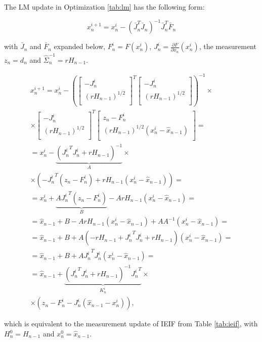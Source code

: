  The LM update in Optimization \ref{tab:lm} has the following form: 
 
 \begin{equation}
 x_n^{i + 1}= x_n^{i} - (\bar{J}_n^T \bar{J}_n)^{-1} \bar{J}_n^T \bar{F}_n 
\end{equation}
 
 with $\bar{J}_n$ and $\bar{F}_n$ expanded below, $F_n^i = F(x_n^i)$, 
 $J_n^i = \frac{\partial F}{\partial x_n}(x_n^i)$, the measurement $z_n = d_n$ and $\hat{\Sigma}_n^{-1} = r H_{n - 1}$.
 
 \begin{align*}
x_n^{i + 1}= x_n^{i} - \left(
\left[
	\begin{array}{cc}
		- J_n^i \\
		\left(r H_{n - 1}\right)^{1/2} \\
	\end{array}
\right]^T 
\left[
	\begin{array}{c}
		- J_n^i \\
		\left(r H_{n - 1}\right)^{1/2} \\
	\end{array}
\right]
\right)^{-1} \times\\
\times \left[
	\begin{array}{cc}
		- J_n^i \\
		\left(r H_{n - 1}\right)^{1/2} \\
	\end{array}
\right]^T 
\left[
	\begin{array}{c}
		z_n - F_n^i \\
		\left(r H_{n - 1}\right)^{1/2}(x_n^i - \hat{x}_{n - 1}) \\
	\end{array}
\right] = \\
= x_n^{i} - \underbrace{\left({J_n^i}^T J_n^i + r H_{n - 1}\right)^{-1}}_{A} \times \\
\times \left( - {J_n^i}^T(z_n - F_n^i) + r H_{n - 1}(x_n^i - \hat{x}_{n - 1})\right)  = \\
= x_n^i +\underbrace{A {J_n^i}^T(z_n - F_n^i)}_B - A r H_{n - 1}(x_n^i - \hat{x}_{n - 1})  = \\
= \hat{x}_{n - 1} + B  - A r H_{n - 1}(x_n^i - \hat{x}_{n - 1}) + A A^{-1}( x_n^i - \hat{x}_{n - 1}) = \\
= \hat{x}_{n - 1} + B + A(- r H_{n - 1} + {J_n^i}^T J_n^i + r H_{n - 1})(x_n^i - \hat{x}_{n - 1}) = \\
= \hat{x}_{n - 1} + B + A {J_n^i}^T J_n^i (x_n^i - \hat{x}_{n - 1}) = \\
= \hat{x}_{n - 1} + \underbrace{\left({J_n^i}^T J_n^i + r H_{n - 1}\right)^{-1} {J_n^i}^T}_{K_n^i} \times \\
\times (z_n - F_n^i - J_n^i (\hat{x}_{n - 1} - x_n^i)),
 \end{align*}
 
 which is equivalent to the measurement update of IEIF from Table \ref{tab:ieif}, with $H_n^0 = H_{n-1}$ and $x_n^0 = \hat{x}_{n - 1}$.
 
